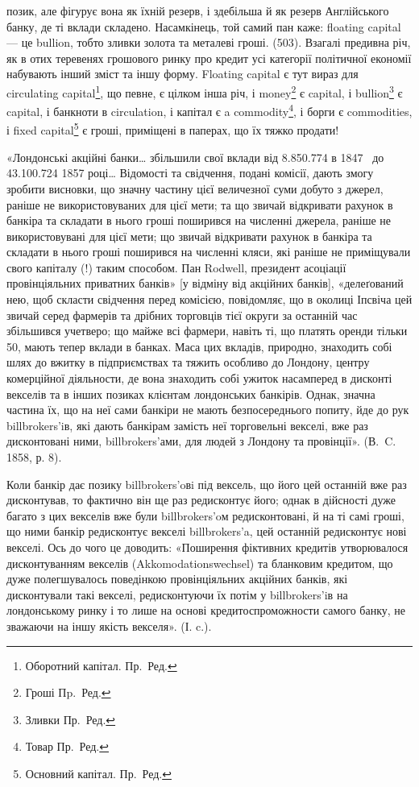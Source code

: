 \parcont{}  %
позик, але фігурує вона як їхній резерв, і здебільша й як резерв Англійського
банку, де ті вклади складено. Насамкінець, той самий пан каже: floating
capital — це bullion, тобто зливки золота та металеві гроші. (503). Взагалі предивна
річ, як в отих теревенях грошового ринку про кредит усі категорії політичної
економії набувають інший зміст та іншу форму. Floating capital є тут
вираз для circulating capital\footnote*{
Оборотний капітал. Пр.~Ред.
}, що певне, є цілком інша річ, і money\footnote*{
Гроші Пp.~Ред.
} є capital,
і bullion\footnote*{
Зливки Пр.~Ред.
} є capital, і банкноти в circulation, і капітал є a commodity\footnote*{
Товар Пр.~Ред.
}, і борги є
commodities, і fixed capital\footnote*{
Основний капітал. Пр.~Ред.
} є гроші, приміщені в паперах, що їх тяжко продати!

«Лондонські акційні банки\dots{} збільшили свої вклади від \num{8.850.774}
в 1847~ до \num{43.100.724} 1857 році\dots{} Відомості та свідчення, подані
комісії, дають змогу зробити висновки, що значну частину цієї величезної суми
добуто з джерел, раніше не використовуваних для цієї мети; та що звичай відкривати
рахунок в банкіра та складати в нього гроші поширився на численні
джерела, раніше не використовувані для цієї мети; що звичай відкривати рахунок
в банкіра та складати в нього гроші поширився на численні кляси, які
раніше не приміщували свого капіталу (!) таким способом. Пан Rodwell, президент
асоціації провінціяльних приватних банків» [у відміну від акційних
банків], «делеґований нею, щоб скласти свідчення перед комісією, повідомляє,
що в околиці Іпсвіча цей звичай серед фармерів та дрібних торговців тієї
округи за останній час збільшився учетверо; що майже всі фармери, навіть ті,
що платять оренди тільки 50, мають тепер вклади в банках. Маса
цих вкладів, природно, знаходить собі шлях до вжитку в підприємствах та
тяжить особливо до Лондону, центру комерційної діяльности, де вона знаходить
собі ужиток насамперед в дисконті векселів та в інших позиках клієнтам лондонських
банкірів. Однак, значна частина їх, що на неї сами банкіри не мають
безпосереднього попиту, йде до рук billbrokers’iв, які дають банкірам замість
неї торговельні векселі, вже раз дисконтовані ними, billbrokers’ами, для людей
з Лондону та провінції». (В.~C. 1858, р. 8).

Коли банкір дає позику billbrokers’oвi під вексель, що його цей останній
вже раз дисконтував, то фактично він ще раз редисконтує його; однак в дійсності
дуже багато з цих векселів вже були billbrokers’oм редисконтовані, й на
ті самі гроші, що ними банкір редисконтує векселі billbrokers’a, цей останній
редисконтує нові векселі. Ось до чого це доводить: «Поширення фіктивних кредитів
утворювалося дисконтуванням векселів (Akkomodationswechsel) та бланковим
кредитом, що дуже полегшувалось поведінкою провінціяльних акційних банків,
які дисконтували такі векселі, редисконтуючи їх потім у billbrokers’iв на лондонському
ринку і то лише на основі кредитоспроможности самого банку, не
зважаючи на іншу якість векселя». (І. c.).

